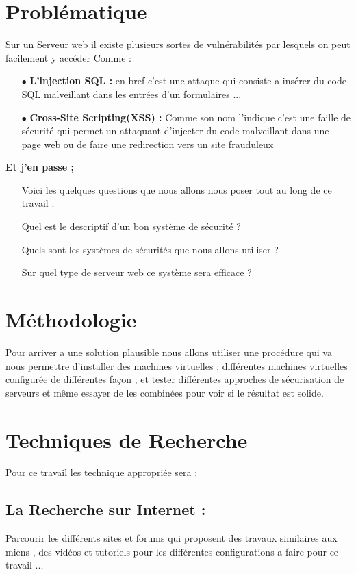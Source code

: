    \section{Problématique}
   Sur un Serveur web il existe plusieurs sortes de vulnérabilités par lesquels on peut facilement y accéder Comme : 
   \begin{itemize}
   	 \item[$\bullet$]\textbf{ L'injection SQL : }
   	 en bref c'est une attaque qui consiste a insérer du code SQL malveillant  dans les entrées   d'un formulaires ...\\
   	 \item[$\bullet$]\textbf{ Cross-Site Scripting(XSS) :} Comme son nom l'indique c'est une faille de sécurité qui permet un attaquant d'injecter du code malveillant dans une page web ou de faire une redirection vers un site frauduleux 
   \end{itemize}
     
 
   \textbf{Et j'en passe ;\\}
   
  
   \pagebreak
   \begin{itemize}
   	 \item[ ] Voici les  quelques questions que nous allons nous poser tout au long de ce travail :
   \item[\space\textendash]Quel est le descriptif d'un bon système de sécurité ?
   \item[\space\textendash] Quels sont les systèmes de sécurités  que nous allons utiliser ?
   \item[\space\textendash] Sur quel type de serveur web ce système sera efficace ?
   \end{itemize}
   
   \section{Méthodologie}
   Pour arriver a une solution plausible  nous allons utiliser une procédure  qui va nous permettre d'installer des machines virtuelles ; différentes machines virtuelles configurée de différentes façon  ;  et tester différentes approches de sécurisation de serveurs et même essayer de les combinées pour voir si le résultat est solide.
  \section{ Techniques de Recherche }
  Pour ce travail les technique appropriée sera :
  \subsection{La Recherche sur Internet :}
  Parcourir les différents  sites et forums qui proposent des travaux similaires aux miens , des vidéos et tutoriels pour les différentes configurations a faire  pour ce travail ...

